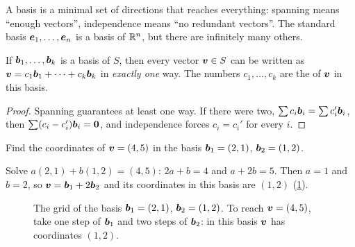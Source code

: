 A basis is a minimal set of directions that reaches everything: spanning
means ``enough vectors'', independence means ``no redundant vectors''. The
standard basis $\bm{e}_1, \dots, \bm{e}_n$ is a basis of $\mathbb{R}^n$, but there are
infinitely many others.

\begin{theorem}\label{thm:unique-coordinates}
If $\bm{b}_1, \dots, \bm{b}_k$ is a basis of $S$, then every vector $\bm{v} \in S$ can be
written as $\bm{v} = c_1\bm{b}_1 + \dots + c_k\bm{b}_k$ in \emph{exactly one} way. The
numbers $c_1, \dots, c_k$ are the 
of $\bm{v}$ in this basis.
\end{theorem}

\begin{proof}
Spanning guarantees at least one way. If there were two,
$\sum c_i\bm{b}_i = \sum c_i'\bm{b}_i$, then $\sum (c_i - c_i')\bm{b}_i = \bm{0}$, and
independence forces $c_i = c_i'$ for every $i$.
\end{proof}

\begin{example}\label{ex:coordinates}
Find the coordinates of $\bm{v} = (4, 5)$ in the basis $\bm{b}_1 = (2, 1)$,
$\bm{b}_2 = (1, 2)$.

\sol Solve $a(2, 1) + b(1, 2) = (4, 5)$: $2a + b = 4$ and $a + 2b = 5$. Then
$a = 1$ and $b = 2$, so $\bm{v} = \bm{b}_1 + 2\bm{b}_2$ and its coordinates in this basis
are $(1, 2)$ (\cref{fig:basis-grid}).
\end{example}

\begin{figure}[htbp]
\centering
{}
\caption{The grid of the basis $\bm{b}_1 = (2,1)$, $\bm{b}_2 = (1,2)$. To reach
  $\bm{v} = (4,5)$, take one step of $\bm{b}_1$ and two steps of $\bm{b}_2$: in this
  basis $\bm{v}$ has coordinates $(1, 2)$.}
\label{fig:basis-grid}
\end{figure}

